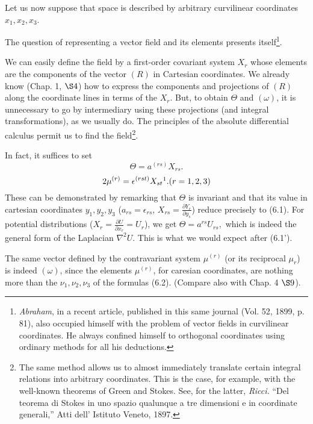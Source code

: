 \documentclass{book}
\begin{document}
Let us now suppose that space is described by arbitrary curvilinear coordinates $x_1,x_2,x_3$.

The question of representing a vector field and its elements presents itself\footnote{\emph{Abraham}, in a recent article, published in this same journal (Vol. 52, 1899, p. 81), also occupied himself with the problem of vector fields in curvilinear coordinates. He always confined himself to orthogonal coordinates using ordinary methods for all his deductions.}.

We can easily define the field by a first-order covariant system $X_r$ whose elements are the components of the vector $(R)$ in Cartesian coordinates. We already know (Chap. 1, $\S4$) how to express the components and projections of $(R)$ along the coordinate lines in terms of the $X_r$. But, to obtain $\Theta$ and $(\omega)$, it is unnecessary to go by intermediary using these projections (and integral transformations), as we usually do. The principles of the absolute differential calculus permit us to find the field\footnote{The same method allows us to almost immediately translate certain integral relations into arbitrary coordinates. This is the case, for example, with the well-known theorems of Green and Stokes. See, for the latter, \emph{Ricci.} ``Del teorema di Stokes in uno spazio qualunque a tre dimensioni e in coordinate generali,'' Atti dell' Istituto Veneto, 1897.}. 

In fact, it suffices to set
\begin{equation}
\Theta=a^{(rs)}X_{rs}.
\end{equation}
\begin{equation}
2\mu^{(r)}=	\epsilon^{(rst)}X_{st}\footnote{For the definitions of these symbols, see chapter 1, $\S5$.}. (r=1,2,3)
\end{equation}
These can be demonstrated by remarking that $\Theta$ is invariant and that its value in cartesian coordinates $y_1,y_2,y_3$ ($a_{rs}=\epsilon_{rs}$, $X_{rs}=\frac{\partial Y_r}{\partial y_s}$) reduce precisely to (6.1). For potential distributions ($X_r=\frac{\partial U}{\partial x_r}=U_r$), we get $\Theta=a^{rs}U_{rs},$ which is indeed the general form of the Laplacian $\nabla^2U$. This is what we would expect after (6.1'). 

The same vector defined by the contravariant system $\mu^{(r)}$ (or its reciprocal $\mu_r$) is indeed $(\omega)$, since the elements $\mu^{(r)}$, for caresian coordinates, are nothing more than the $\nu_1,\nu_2,\nu_3$ of the formulas (6.2). (Compare also with Chap. 4 $\S9$).
\end{document}
